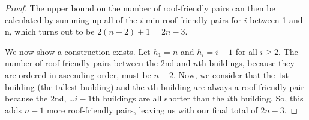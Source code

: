 \documentclass[10pt]{../usamts}
\begin{document}
\begin{solution}{3}
\begin{proof}
    The upper bound on the number of roof-friendly pairs can then be calculated by summing up all of the $i$-min roof-friendly pairs for $i$ between 1 and n, which turns out to be $2(n-2) + 1 = 2n-3$.
    
    We now show a construction exists. Let $h_1 = n$ and $h_i = i-1$ for all $i \ge 2$. The number of roof-friendly pairs between the 2nd and $n$th buildings, because they are ordered in ascending order, must be $n-2$. Now, we consider that the $1$st building (the tallest building) and the $i$th building are always a roof-friendly pair because the $2$nd, \dots $i-1$th buildings are all shorter than the $i$th building. So, this adds $n-1$ more roof-friendly pairs, leaving us with our final total of $2n-3$.
\end{proof}

\end{solution}
\end{document}
